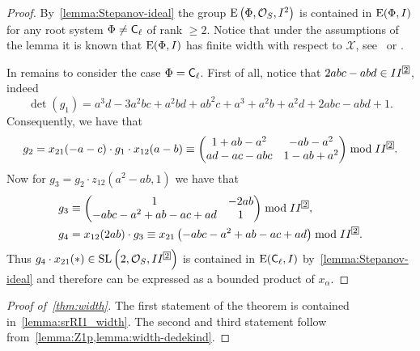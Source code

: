 \begin{proof}
By~\cref{lemma:Stepanov-ideal} the group $\operatorname{E}\left(\Phi,\mathcal{O}_S,I^2\right)$ is contained in $\operatorname{E}(\Phi,I)$ for any root system $\Phi\neq\mathsf{C}_\ell$ of rank $\geqslant2$.
Notice that under the assumptions of the lemma it is known that $\operatorname{E}(\Phi,I)$ has finite width with respect to $\mathcal{X}$, see~\cite{Tavgen93} or \cite[Theorem~3.3]{TavgenThesis}.

In remains to consider the case $\Phi=\mathsf{C}_\ell$. First of all, notice that $2abc-abd\in II^{\indexbox{2}}$, indeed
\[ \det(g_1)=a^3d-3a^2bc+a^2bd+ab^2c+a^3+a^2b+a^2d+2abc-abd+1. \]
Consequently, we have that
\[ g_2=x_{21}(-a-c)\cdot g_1\cdot x_{12}(a-b)\equiv
\begin{pmatrix}
1+ab-a^2 & -ab-a^2 \\ ad-ac-abc & 1-ab+a^2
\end{pmatrix}\bmod II^{\indexbox{2}}. \]
Now for $g_3=g_2\cdot z_{12}\left(a^2-ab,1\right)$ we have that
\begin{align*}
& g_3\equiv\begin{pmatrix} 1 & -2ab \\ -abc-a^2+ab-ac+ad & 1 \end{pmatrix}\bmod II^{\indexbox{2}},\\
& g_4=x_{12}(2ab)\cdot g_3\equiv x_{21}\left(-abc-a^2+ab-ac+ad\right)\bmod II^{\indexbox{2}}.
\end{align*}
Thus $g_4\cdot x_{21}(*)\in\SL\left(2,\mathcal{O}_S,II^{\indexbox{2}}\right)$ is contained in $\operatorname{E}(\mathsf{C}_\ell,I)$ by~\cref{lemma:Stepanov-ideal} and therefore can be expressed as a bounded product of $x_\alpha$.
\end{proof}

\begin{proof}[Proof of~\cref{thm:width}] The first statement of the theorem is contained in~\cref{lemma:srRI1_width}.
The second and third statement follow from~\cref{lemma:Z1p,lemma:width-dedekind}. \end{proof}
